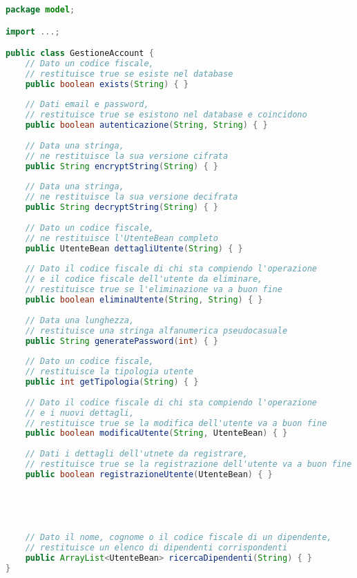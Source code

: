 \documentclass[12pt,a4paper]{article}
\begin{document}
\begin{lstlisting}[language=Java]
package model;

import ...;

public class GestioneAccount {
	// Dato un codice fiscale, 
	// restituisce true se esiste nel database
	public boolean exists(String) { }
	
	// Dati email e password,
	// restituisce true se esistono nel database e coincidono
	public boolean autenticazione(String, String) { }
	
	// Data una stringa, 
	// ne restituisce la sua versione cifrata
	public String encryptString(String) { }
	
	// Data una stringa, 
	// ne restituisce la sua versione decifrata
	public String decryptString(String) { }
	
	// Dato un codice fiscale,
	// ne restituisce l'UtenteBean completo
	public UtenteBean dettagliUtente(String) { }
	
	// Dato il codice fiscale di chi sta compiendo l'operazione
	// e il codice fiscale dell'utente da eliminare,
	// restituisce true se l'eliminazione va a buon fine
	public boolean eliminaUtente(String, String) { }
	
	// Data una lunghezza,
	// restituisce una stringa alfanumerica pseudocasuale
	public String generatePassword(int) { }
	
	// Dato un codice fiscale,
	// restituisce la tipologia utente
	public int getTipologia(String) { }
	
	// Dato il codice fiscale di chi sta compiendo l'operazione
	// e i nuovi dettagli,
	// restituisce true se la modifica dell'utente va a buon fine	
	public boolean modificaUtente(String, UtenteBean) { }
	
	// Dati i dettagli dell'utnete da registrare,
	// restituisce true se la registrazione dell'utente va a buon fine
	public boolean registrazioneUtente(UtenteBean) { }
	

	
	
	
	// Dato il nome, cognome o il codice fiscale di un dipendente,
	// restituisce un elenco di dipendenti corrispondenti
	public ArrayList<UtenteBean> ricercaDipendenti(String) { }
}
\end{lstlisting}
\end{document}
